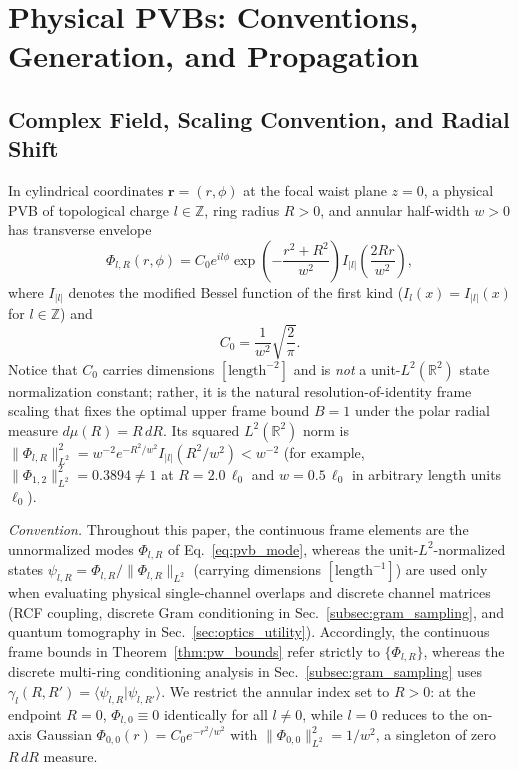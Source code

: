 \documentclass[aps,pra,reprint,amsmath,amssymb,floatfix,longbibliography]{revtex4-2}
\providecommand{\braket}[2]{\langle#1\vert#2\rangle}
\providecommand{\abs}[1]{\lvert#1\rvert}
\providecommand{\norm}[1]{\lVert#1\rVert}
\begin{document}
\section{Physical PVBs: Conventions, Generation, and Propagation}
\label{sec:pvb_formation}

\subsection{Complex Field, Scaling Convention, and Radial Shift}
\label{subsec:pvb_def}

In cylindrical coordinates $\mathbf{r} = (r,\phi)$ at the focal waist plane $z = 0$, a physical PVB of topological charge $l \in \mathbb{Z}$, ring radius $R > 0$, and annular half-width $w > 0$ has transverse envelope~\cite{Ostrovsky2013,Vaity2015}
\begin{equation}
\Phi_{l,R}(r,\phi) = C_0 e^{il\phi} \exp\!\left(-\frac{r^2 + R^2}{w^2}\right) I_{\abs{l}}\!\left(\frac{2Rr}{w^2}\right),
\label{eq:pvb_mode}
\end{equation}
where $I_{\abs{l}}$ denotes the modified Bessel function of the first kind ($I_l(x) = I_{\abs{l}}(x)$ for $l \in \mathbb{Z}$) and
\begin{equation}
C_0 = \frac{1}{w^2}\sqrt{\frac{2}{\pi}}.
\label{eq:C0_norm}
\end{equation}
Notice that $C_0$ carries dimensions $[\mathrm{length}^{-2}]$ and is \emph{not} a unit-$L^2(\mathbb{R}^2)$ state normalization constant; rather, it is the natural resolution-of-identity frame scaling that fixes the optimal upper frame bound $B = 1$ under the polar radial measure $d\mu(R) = R\,dR$. Its squared $L^2(\mathbb{R}^2)$ norm is $\norm{\Phi_{l,R}}_{L^2}^2 = w^{-2} e^{-R^2/w^2} I_{\abs{l}}(R^2/w^2) < w^{-2}$ (for example, $\norm{\Phi_{1,2}}_{L^2}^2 = 0.3894 \neq 1$ at $R = 2.0\,\ell_0$ and $w = 0.5\,\ell_0$ in arbitrary length units $\ell_0$).

\emph{Convention.} Throughout this paper, the continuous frame elements are the unnormalized modes $\Phi_{l,R}$ of Eq.~\eqref{eq:pvb_mode}, whereas the unit-$L^2$-normalized states $\psi_{l,R} = \Phi_{l,R}/\norm{\Phi_{l,R}}_{L^2}$ (carrying dimensions $[\mathrm{length}^{-1}]$) are used only when evaluating physical single-channel overlaps and discrete channel matrices (RCF coupling, discrete Gram conditioning in Sec.~\ref{subsec:gram_sampling}, and quantum tomography in Sec.~\ref{sec:optics_utility}). Accordingly, the continuous frame bounds in Theorem~\ref{thm:pw_bounds} refer strictly to $\{\Phi_{l,R}\}$, whereas the discrete multi-ring conditioning analysis in Sec.~\ref{subsec:gram_sampling} uses $\gamma_l(R,R') = \braket{\psi_{l,R}}{\psi_{l,R'}}$. We restrict the annular index set to $R > 0$: at the endpoint $R = 0$, $\Phi_{l,0} \equiv 0$ identically for all $l \neq 0$, while $l = 0$ reduces to the on-axis Gaussian $\Phi_{0,0}(r) = C_0 e^{-r^2/w^2}$ with $\norm{\Phi_{0,0}}_{L^2}^2 = 1/w^2$, a singleton of zero $R\,dR$ measure.
\end{document}
